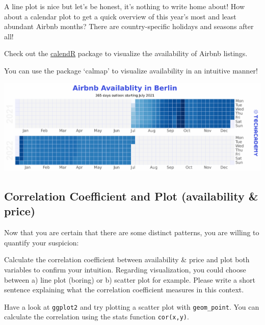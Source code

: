\documentclass[
  11pt,
]{article}
\newenvironment{tips}[1]
  {
  \begin{itemize}
  \footnotesize
  \renewcommand{\labelitemi}{
    \raisebox{-.7\height}[0pt][0pt]{
      {\setkeys{Gin}{width=3em,keepaspectratio}
        \texttt{[image: images/\#1.png]}}
    }
  }
  \setlength{\fboxsep}{1em}
  \begin{rbox}
  \item
  }
  {
  \end{rbox}
  \end{itemize}
  }
\newenvironment{tipsp}[1]
  {
  \begin{itemize}
  \footnotesize
  \renewcommand{\labelitemi}{
    \raisebox{-.7\height}[0pt][0pt]{
      {\setkeys{Gin}{width=3em,keepaspectratio}
        \texttt{[image: images/\#1.png]}}
    }
  }
  \setlength{\fboxsep}{1em}
  \begin{pbox}
  \item
  }
  {
  \end{pbox}
  \end{itemize}
  }
\begin{document}
A line plot is nice but let's be honest, it's nothing to write home about! How about a calendar plot to get a quick overview of this year's most and least abundant Airbnb months?
There are country-specific holidays and seasons after all!

\begin{tips}r
Check out the \href{https://r-coder.com/calendar-plot-r/}{calendR} package to visualize the availability of Airbnb listings.

\end{tips}

\begin{tipsp}p
You can use the package `calmap' to visualize availability in an intuitive manner!

\end{tipsp}

\begin{center}\includegraphics[width=1\linewidth]{plot/01_python/calendar} \end{center}

\hypertarget{correlation-coefficient-and-plot-availability-price}{%
\subsection{Correlation Coefficient and Plot (availability \& price)}\label{correlation-coefficient-and-plot-availability-price}}

Now that you are certain that there are some distinct patterns, you are willing to quantify your suspicion:

Calculate the correlation coefficient between availability \& price and plot both variables to confirm your intuition. Regarding visualization, you could choose between a) line plot (boring) or b) scatter plot for example. Please write a short sentence explaining what the correlation coefficient measures in this context.

\begin{tips}r
Have a look at \texttt{ggplot2} and try plotting a scatter plot with \texttt{geom\_point}. You can calculate the correlation using the stats function \texttt{cor(x,y)}.

\end{tips}
\end{document}
